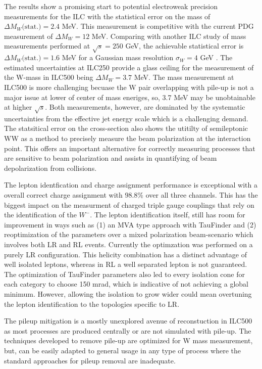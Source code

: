 The results show a promising start to potential electroweak precision measurements for the ILC with the statistical error on the mass of $\Delta M_W\text{(stat.)}= 2.4$ MeV. This measurement is competitive with the current PDG measurement of $\Delta M_W=12$ MeV.   Comparing with another ILC study of mass measurements performed at $\sqrt{s} = 250$ GeV, the achievable statistical error is $\Delta M_W\text{(stat.)} = 1.6$ MeV for a Gaussian mass resolution $\sigma_W= 4$ GeV \cite{graham}. The estimated uncertainties at ILC250 provide a glass ceiling for the measurement of the W-mass in ILC500 being $\Delta M_W =3.7$ MeV. The mass measurement at ILC500 is more challenging becuase the W pair overlapping with pile-up is not a major issue at lower of center of mass eneriges, so, 3.7 MeV may be unobtainable at higher $\sqrt{s}$. Both measurements, however, are dominated by the systematic uncertainties from the effective jet energy scale which is a challenging demand.  The statsitical error on the cross-section also shows the utitilty of semileptonic WW as a method to precisely measure the beam polarization at the interaction point. This offers an important alternative for  correctly measuring processes that are sensitive to beam polarization and assists in quantifying of beam depolarization from collisions.

The lepton identfication and charge assignment performance is exceptional with a overall correct charge assignment with $98.8\%$ over all three channels. This has the biggest impact on the measurment of charged triple gauge couplings that rely on the identification of the $W^-$. The lepton identification itself, still has room for improvement in ways such as (1) an MVA type approach with TauFinder and (2) reoptimization of the parameters over a mixed polarization beam-scenario which involves both LR and RL events. Currently the optimzation was performed on a purely LR configuration. This helicity combination has a distinct advantage of well isolated leptons, whereas in RL a well separated lepton is not guaranteed. The optimization of TauFinder parameters also led to every isolation cone for each category to choose 150 mrad, which is indicative of not achieving a global minimum. However, allowing the isolation to grow wider could mean overtuning the lepton identification to the topologies specific to LR. 

The pileup mitigation is a mostly unexplored avenue of reconstuction in ILC500 as most processes are produced centrally or are not simulated with pile-up. The techniques developed to remove pile-up are optimized for W mass measurement, but, can be easily adapted to general usage in any type of process where the standard approaches for pileup removal are inadequate. 

